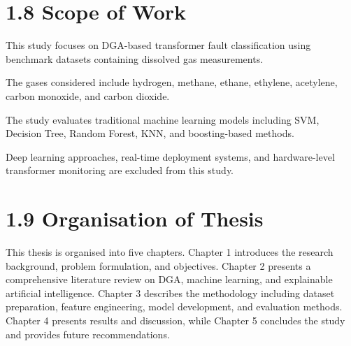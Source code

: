 \section{1.8 Scope of Work}

This study focuses on DGA-based transformer fault classification using benchmark datasets containing dissolved gas measurements.

The gases considered include hydrogen, methane, ethane, ethylene, acetylene, carbon monoxide, and carbon dioxide.

The study evaluates traditional machine learning models including SVM, Decision Tree, Random Forest, KNN, and boosting-based methods.

Deep learning approaches, real-time deployment systems, and hardware-level transformer monitoring are excluded from this study.

\section{1.9 Organisation of Thesis}

This thesis is organised into five chapters. Chapter 1 introduces the research background, problem formulation, and objectives. Chapter 2 presents a comprehensive literature review on DGA, machine learning, and explainable artificial intelligence. Chapter 3 describes the methodology including dataset preparation, feature engineering, model development, and evaluation methods. Chapter 4 presents results and discussion, while Chapter 5 concludes the study and provides future recommendations.